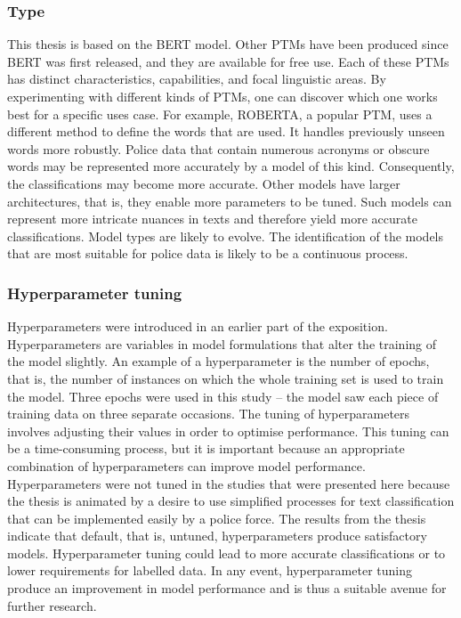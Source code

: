 \subsubsection{Type} This thesis is based on the BERT model. Other PTMs have been produced since BERT was first released, and they are available for free use. Each of these PTMs has distinct characteristics, capabilities, and focal linguistic areas. By experimenting with different kinds of PTMs, one can discover which one works best for a specific uses case. For example, ROBERTA, a popular PTM, uses a different method to define the words that are used. It handles previously unseen words more robustly. Police data that contain numerous acronyms or obscure words may be represented more accurately by a model of this kind. Consequently, the classifications may become more accurate. Other models have larger architectures, that is, they enable more parameters to be tuned. Such models can represent more intricate nuances in texts and therefore yield more accurate classifications. Model types are likely to evolve. The identification of the models that are most suitable for police data is likely to be a continuous process.

\subsubsection{Hyperparameter tuning} Hyperparameters were introduced in an earlier part of the exposition. Hyperparameters are variables in model formulations that alter the training of the model slightly. An example of a hyperparameter is the number of epochs, that is, the number of instances on which the whole training set is used to train the model. Three epochs were used in this study – the model saw each piece of training data on three separate occasions. The tuning of hyperparameters involves adjusting their values in order to optimise performance. This tuning can be a time-consuming process, but it is important because an appropriate combination of hyperparameters can improve model performance. Hyperparameters were not tuned in the studies that were presented here because the thesis is animated by a desire to use simplified processes for text classification that can be implemented easily by a police force. The results from the thesis indicate that default, that is, untuned, hyperparameters produce satisfactory models. Hyperparameter tuning could lead to more accurate classifications or to lower requirements for labelled data. In any event, hyperparameter tuning produce an improvement in model performance and is thus a suitable avenue for further research.

